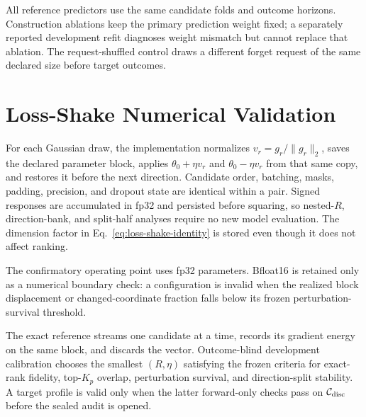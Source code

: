 All reference predictors use the same candidate folds and outcome horizons.
Construction ablations keep the primary prediction weight fixed; a separately
reported development refit diagnoses weight mismatch but cannot replace that
ablation. The request-shuffled control draws a different forget request of the
same declared size before target outcomes.

\FloatBarrier

\section{Loss-Shake Numerical Validation}
\label{app:estimator-stability}
\label{app:probe-details}
\label{app:randomized-impl}

For each Gaussian draw, the implementation normalizes
$v_r=g_r/\lVert g_r\rVert_2$, saves the declared parameter block, applies
$\theta_0+\eta v_r$ and $\theta_0-\eta v_r$ from that same copy, and restores
it before the next direction. Candidate order,
batching, masks, padding, precision, and dropout state are identical within a
pair. Signed responses are accumulated in fp32 and persisted before squaring,
so nested-$R$, direction-bank, and split-half analyses require no new model
evaluation. The dimension factor in Eq.~\eqref{eq:loss-shake-identity} is
stored even though it does not affect ranking.

The confirmatory operating point uses fp32 parameters. Bfloat16 is retained
only as a numerical boundary check: a configuration is invalid when the
realized block displacement or changed-coordinate fraction falls below its
frozen perturbation-survival threshold.

The exact reference streams one candidate at a time, records its gradient
energy on the same block, and discards the vector. Outcome-blind development
calibration chooses the smallest $(R,\eta)$ satisfying the frozen criteria for
exact-rank fidelity, top-$K_p$ overlap, perturbation survival, and
direction-split stability. A
target profile is valid only when the latter forward-only checks pass on
$\mathcal C_{\rm disc}$ before the sealed audit is opened.
\label{app:fidelity-gate}


